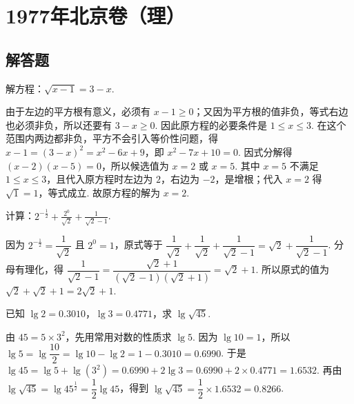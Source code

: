 \chapter{1977年北京卷（理）}

\section{解答题}

\begin{problem}
解方程：\(\sqrt{x-1}=3-x\).
\end{problem}

\begin{solution}
由于左边的平方根有意义，必须有 \(x-1\geqslant0\)；又因为平方根的值非负，等式右边也必须非负，所以还要有 \(3-x\geqslant0\). 因此原方程的必要条件是 \(1\leqslant x\leqslant3\). 在这个范围内两边都非负，平方不会引入等价性问题，得 \(x-1=\left(3-x\right)^2=x^2-6x+9\)，即 \(x^2-7x+10=0\). 因式分解得 \(\left(x-2\right)\left(x-5\right)=0\)，所以候选值为 \(x=2\) 或 \(x=5\). 其中 \(x=5\) 不满足 \(1\leqslant x\leqslant3\)，且代入原方程时左边为 \(2\)，右边为 \(-2\)，是增根；代入 \(x=2\) 得 \(\sqrt{1}=1\)，等式成立. 故原方程的解为 \(x=2\).
\end{solution}

\begin{problem}
计算：\(2^{-\frac{1}{2}}+\frac{2^0}{\sqrt{2}}+\frac{1}{\sqrt{2}-1}\).
\end{problem}

\begin{solution}
因为 \(2^{-\frac{1}{2}}=\dfrac{1}{\sqrt{2}}\) 且 \(2^0=1\)，原式等于 \(\dfrac{1}{\sqrt{2}}+\dfrac{1}{\sqrt{2}}+\dfrac{1}{\sqrt{2}-1}=\sqrt{2}+\dfrac{1}{\sqrt{2}-1}\). 分母有理化，得 \(\dfrac{1}{\sqrt{2}-1}=\dfrac{\sqrt{2}+1}{\left(\sqrt{2}-1\right)\left(\sqrt{2}+1\right)}=\sqrt{2}+1\). 所以原式的值为 \(\sqrt{2}+\sqrt{2}+1=2\sqrt{2}+1\).
\end{solution}

\begin{problem}
已知 \(\lg 2=0.3010\)，\(\lg 3=0.4771\)，求 \(\lg\sqrt{45}\).
\end{problem}

\begin{solution}
由 \(45=5\times3^2\)，先用常用对数的性质求 \(\lg5\). 因为 \(\lg10=1\)，所以 \(\lg5=\lg\dfrac{10}{2}=\lg10-\lg2=1-0.3010=0.6990\). 于是 \(\lg45=\lg5+\lg\left(3^2\right)=0.6990+2\lg3=0.6990+2\times0.4771=1.6532\). 再由 \(\lg\sqrt{45}=\lg45^{\frac{1}{2}}=\dfrac{1}{2}\lg45\)，得到 \(\lg\sqrt{45}=\dfrac{1}{2}\times1.6532=0.8266\).
\end{solution}

